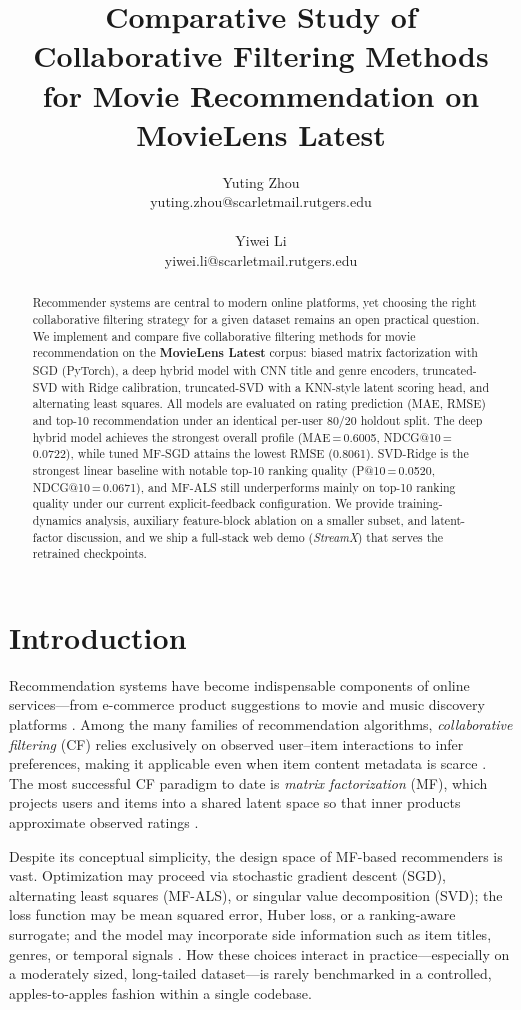 \documentclass[11pt]{article}
\title{Comparative Study of Collaborative Filtering Methods\\for Movie Recommendation on MovieLens Latest}
\author{
  Yuting Zhou \\
  yuting.zhou@scarletmail.rutgers.edu \\
  \\\And
  Yiwei Li \\
  yiwei.li@scarletmail.rutgers.edu \\
}
\begin{document}
\maketitle

\begin{abstract}
Recommender systems are central to modern online platforms, yet choosing the right collaborative filtering strategy for a given dataset remains an open practical question. We implement and compare five collaborative filtering methods for movie recommendation on the \textbf{MovieLens Latest} corpus: biased matrix factorization with SGD (PyTorch), a deep hybrid model with CNN title and genre encoders, truncated-SVD with Ridge calibration, truncated-SVD with a KNN-style latent scoring head, and alternating least squares.
All models are evaluated on rating prediction (MAE, RMSE) and top-10 recommendation under an identical per-user 80/20 holdout split.
The deep hybrid model achieves the strongest overall profile (MAE\,=\,0.6005, NDCG@10\,=\,0.0722), while tuned MF-SGD attains the lowest RMSE (0.8061).
SVD-Ridge is the strongest linear baseline with notable top-10 ranking quality (P@10\,=\,0.0520, NDCG@10\,=\,0.0671), and MF-ALS still underperforms mainly on top-10 ranking quality under our current explicit-feedback configuration.
We provide training-dynamics analysis, auxiliary feature-block ablation on a smaller subset, and latent-factor discussion, and we ship a full-stack web demo (\textit{StreamX}) that serves the retrained checkpoints.
\end{abstract}



\section{Introduction}

Recommendation systems have become indispensable components of online services---from e-commerce product suggestions to movie and music discovery platforms \cite{ricci2011introduction}.
Among the many families of recommendation algorithms, \emph{collaborative filtering} (CF) relies exclusively on observed user--item interactions to infer preferences, making it applicable even when item content metadata is scarce \cite{resnick1994grouplens}.
The most successful CF paradigm to date is \emph{matrix factorization} (MF), which projects users and items into a shared latent space so that inner products approximate observed ratings \cite{koren2009matrix}.

Despite its conceptual simplicity, the design space of MF-based recommenders is vast.
Optimization may proceed via stochastic gradient descent (SGD), alternating least squares (MF-ALS), or singular value decomposition (SVD);
the loss function may be mean squared error, Huber loss, or a ranking-aware surrogate;
and the model may incorporate side information such as item titles, genres, or temporal signals \cite{zhang2019deep}.
How these choices interact in practice---especially on a moderately sized, long-tailed dataset---is rarely benchmarked in a controlled, apples-to-apples fashion within a single codebase.
\end{document}
